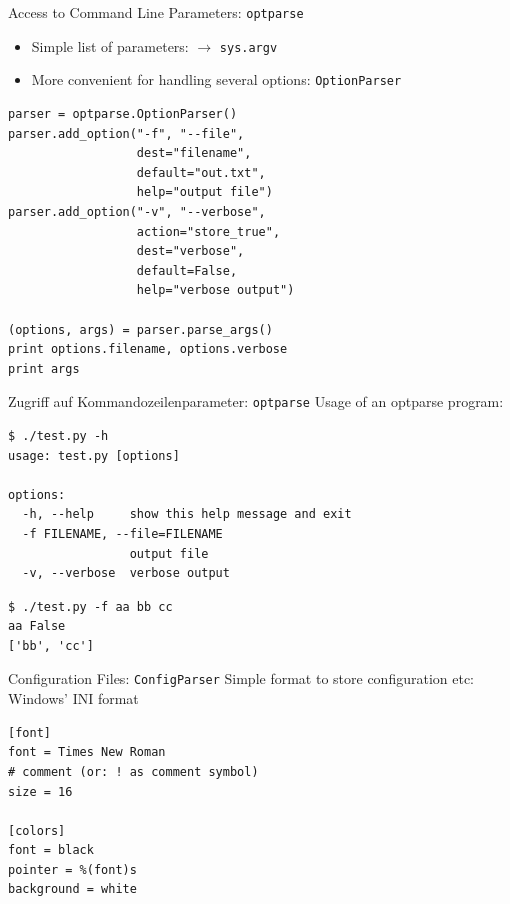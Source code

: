 \begin{frame}[fragile]{Access to Command Line Parameters: \texttt{optparse}}
\begin{itemize}
\item Simple list of parameters: $\rightarrow$ \texttt{sys.argv}
\item More convenient for handling several options: \texttt{OptionParser}
\end{itemize}
\begin{lstlisting}[style=Python]
parser = optparse.OptionParser()
parser.add_option("-f", "--file", 
                  dest="filename",
                  default="out.txt",
                  help="output file")
parser.add_option("-v", "--verbose",
                  action="store_true", 
                  dest="verbose", 
                  default=False,
                  help="verbose output")

(options, args) = parser.parse_args()
print options.filename, options.verbose
print args
\end{lstlisting}
\end{frame}
\begin{frame}[fragile]{Zugriff auf Kommandozeilenparameter: \texttt{optparse}}
Usage of an optparse program:
\begin{lstlisting}[style=Shell]
$ ./test.py -h
usage: test.py [options]

options:
  -h, --help     show this help message and exit
  -f FILENAME, --file=FILENAME
                 output file
  -v, --verbose  verbose output
\end{lstlisting} %
\begin{lstlisting}[style=Shell]
$ ./test.py -f aa bb cc
aa False
['bb', 'cc']
\end{lstlisting} %
\end{frame}

\begin{frame}[fragile]{Configuration Files: \texttt{ConfigParser}}
Simple format to store configuration etc: Windows' INI format
\begin{lstlisting}[style=Python]
[font]
font = Times New Roman
# comment (or: ! as comment symbol)
size = 16

[colors]
font = black
pointer = %(font)s
background = white
\end{lstlisting}
\end{frame}

